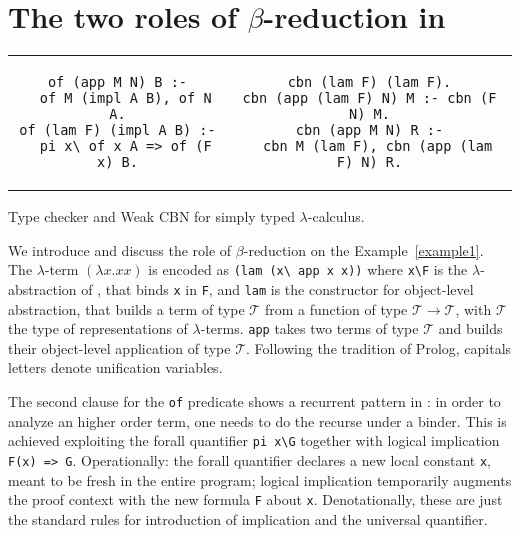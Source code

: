 \documentclass{llncs}
\begin{document}

\section{The two roles of $\beta$-reduction in \lp{}}

\begin{example}[b]
\begin{center}
\begin{tabular}{c@{~~}|@{~~}c}
\begin{minipage}{4.8cm}
\begin{verbatim}
of (app M N) B :-
  of M (impl A B), of N A.
of (lam F) (impl A B) :-
  pi x\ of x A => of (F x) B.
\end{verbatim}
\end{minipage}
&
\begin{minipage}{6.2cm}
\begin{verbatim}
cbn (lam F) (lam F).
cbn (app (lam F) N) M :- cbn (F N) M.
cbn (app M N) R :-
  cbn M (lam F), cbn (app (lam F) N) R.
\end{verbatim}
\end{minipage}
\end{tabular}
\end{center}
\caption{\label{example1} Type checker and Weak CBN for simply typed $\lambda$-calculus.}
\end{example}

We introduce \lp{} and discuss the role of $\beta$-reduction on the
Example~\ref{example1}. The $\lambda$-term %
$(\lambda x.xx)$ is encoded %
as \verb+(lam (x\ app x x))+ where \verb+x\F+ is
the $\lambda$-abstraction of \lp{}, that binds \verb+x+ in \verb+F+, and
\verb+lam+ is the constructor for object-level abstraction, that builds
a term of type $\mathcal{T}$ from a function of type
$\mathcal{T} \to \mathcal{T}$, with $\mathcal{T}$ the type of representations
of $\lambda$-terms. \verb+app+ takes two terms of type $\mathcal{T}$ and builds
their object-level application of type $\mathcal{T}$.  Following the tradition of Prolog, capitals letters denote unification variables.

The second clause for the \verb+of+ predicate shows a recurrent pattern in
\lp: in order to analyze an higher order term, one needs to do the recurse
under a binder. This is achieved
exploiting the forall quantifier \verb+pi x\G+ together with logical
implication \verb+F(x) => G+. Operationally: the forall quantifier declares a
new local constant \verb+x+, meant to be fresh in the entire program;
logical implication temporarily
augments the proof context with the new formula \verb+F+ about \verb+x+.
Denotationally, these are just the standard rules for introduction of
implication and the universal quantifier.
\end{document}
